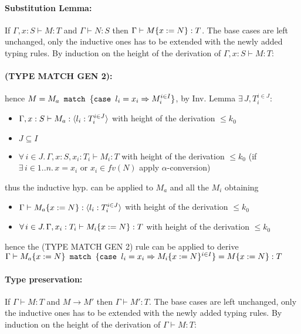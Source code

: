 \paragraph*{Substitution Lemma:\\}
If $\Gamma, x: S \vdash M: T$ and $\Gamma \vdash N: S$ then $\Gamma \vdash M\{x:=N\}: T$.
The base cases are left unchanged, only the inductive ones has to be extended with the newly
added typing rules.
By induction on the height of the derivation of $\Gamma, x: S \vdash M: T$:
\paragraph*{\textmd{(TYPE MATCH GEN 2):}}
hence $M = M_a\texttt{ match }\{\texttt{case }l_i = x_i \Rightarrow M_i^{i \in I}\}$, by Inv. Lemma $\exists\, J, T_i^{i \in J}$:
\begin{itemize}
	\item $\Gamma, x: S \vdash M_a: \langle l_i: T_i^{i \in J} \rangle$ with height of the derivation $\le k_0$
	\item $J \subseteq I$
	\item $\forall\, i \in J.\, \Gamma, x: S, x_i: T_i \vdash M_i: T$ with height of the derivation $\le k_0$
	      (if $\exists\, i \in 1..n.\, x = x_i$ or $x_i \in fv(N)$ apply $\alpha$-conversion)
\end{itemize}
thus the inductive hyp. can be applied to $M_a$ and all the $M_i$ obtaining
\begin{itemize}
	\item $\Gamma \vdash M_a\{x:=N\}: \langle l_i: T_i^{i \in J} \rangle$ with height of the derivation $\le k_0$
	\item $\forall\, i \in J.\, \Gamma, x_i: T_i \vdash M_i\{x:=N\}: T$ with height of the derivation $\le k_0$
\end{itemize}
hence the (TYPE MATCH GEN 2) rule can be applied to derive
$\Gamma \vdash M_a\{x:=N\}\texttt{ match }\{\texttt{case }l_i = x_i \Rightarrow M_i\{x:=N\}^{i \in I}\} = M\{x:=N\}: T$

\paragraph*{Type preservation:\\}
If $\Gamma \vdash M: T$ and $M \to M'$ then $\Gamma \vdash M': T$.
The base cases are left unchanged, only the inductive ones has to be extended with the newly
added typing rules.
By induction on the height of the derivation of $\Gamma \vdash M: T$:
